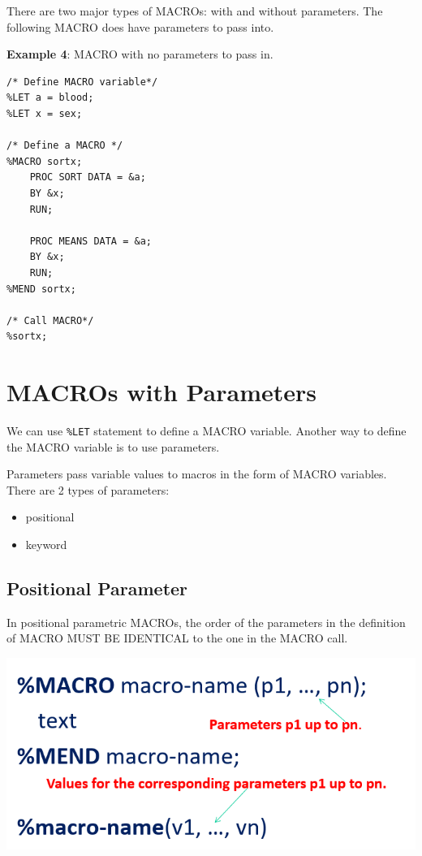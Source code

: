 \documentclass[
]{book}
\providecommand{\tightlist}{%
  \setlength{\itemsep}{0pt}\setlength{\parskip}{0pt}}
\begin{document}
There are two major types of MACROs: with and without parameters. The following MACRO does have parameters to pass into.

\textbf{Example 4}: MACRO with no parameters to pass in.

\begin{verbatim}
/* Define MACRO variable*/
%LET a = blood;
%LET x = sex;

/* Define a MACRO */
%MACRO sortx;
    PROC SORT DATA = &a;
    BY &x;
    RUN;

    PROC MEANS DATA = &a;
    BY &x;
    RUN;
%MEND sortx;

/* Call MACRO*/
%sortx;
\end{verbatim}

\hypertarget{macros-with-parameters}{%
\section{MACROs with Parameters}\label{macros-with-parameters}}

We can use \texttt{\%LET} statement to define a MACRO variable. Another way to define the MACRO variable is to use parameters.

Parameters pass variable values to macros in the form of MACRO variables. There are 2 types of parameters:

\begin{itemize}
\tightlist
\item
  positional
\item
  keyword
\end{itemize}

\hypertarget{positional-parameter}{%
\subsection{Positional Parameter}\label{positional-parameter}}

In positional parametric MACROs, the order of the parameters in the definition of MACRO MUST BE IDENTICAL to the one in the MACRO call.

\begin{center}\includegraphics[width=0.6\linewidth]{img14/w14-MACRO-positionalPar} \end{center}
\end{document}
